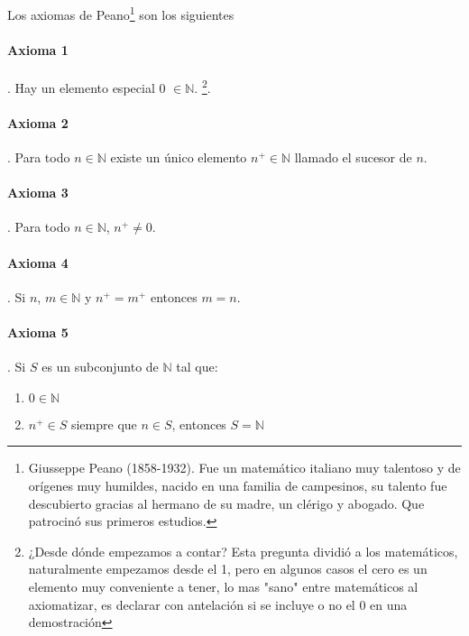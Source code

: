 \documentclass{article}
\begin{document}
Los axiomas de Peano\footnote{Giusseppe Peano (1858-1932). Fue un matemático italiano muy talentoso y de orígenes muy humildes, nacido en una familia de campesinos, su talento fue descubierto gracias al hermano de su madre, un clérigo y abogado. Que patrocinó sus primeros estudios.} son los siguientes\cite{tnumprincip_2004}

\paragraph{Axioma 1}. Hay un elemento especial 0 $\in \mathbb{N}$. \footnote{¿Desde dónde empezamos a contar? Esta pregunta dividió a los matemáticos, naturalmente empezamos desde el 1, pero en algunos casos el cero es un elemento muy conveniente a tener, lo mas "sano" entre matemáticos al axiomatizar, es declarar con antelación si se incluye o no el 0 en una demostración}.
\paragraph{Axioma 2}. Para todo $n \in \mathbb{N}$ existe un único elemento $n^+ \in \mathbb{N}$ llamado el sucesor de $n$.
\paragraph{Axioma 3}. Para todo $n \in \mathbb{N}$, $n^+ \neq 0$.
\paragraph{Axioma 4}. Si $n$, $m \in \mathbb{N}$ y $n^+ = m^+$ entonces $m = n$.
\paragraph{Axioma 5}. Si $S$ es un subconjunto de $\mathbb{N}$ tal que:
\begin{enumerate}
    \item $0 \in \mathbb{N}$
    \item $n^+ \in S$ siempre que $n \in S$, entonces $S = \mathbb{N}$
\end{enumerate}
\end{document}
